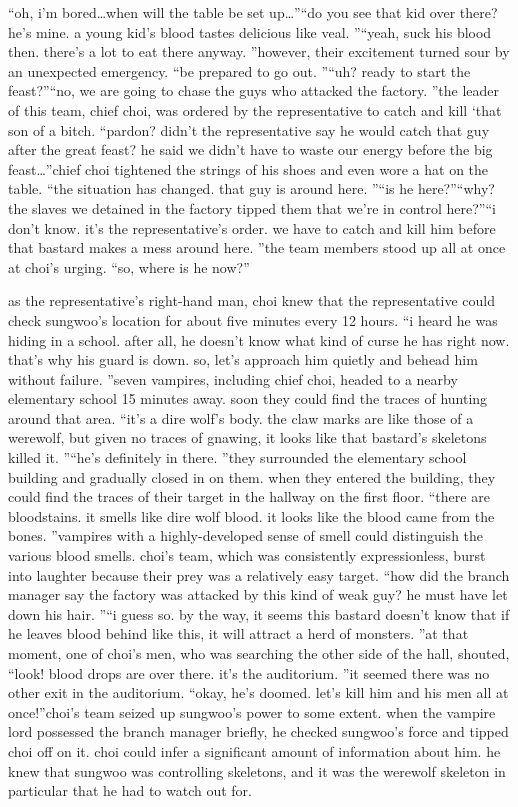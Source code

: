 “oh, i’m bored…when will the table be set up…”“do you see that kid over there? he’s mine.
 a young kid’s blood tastes delicious like veal.
”“yeah, suck his blood then.
 there’s a lot to eat there anyway.
”however, their excitement turned sour by an unexpected emergency.
“be prepared to go out.
”“uh? ready to start the feast?”“no, we are going to chase the guys who attacked the factory.
”the leader of this team, chief choi, was ordered by the representative to catch and kill ‘that son of a bitch.
“pardon? didn’t the representative say he would catch that guy after the great feast? he said we didn’t have to waste our energy before the big feast…”chief choi tightened the strings of his shoes and even wore a hat on the table.
“the situation has changed.
 that guy is around here.
”“is he here?”“why? the slaves we detained in the factory tipped them that we’re in control here?”“i don’t know.
 it’s the representative’s order.
 we have to catch and kill him before that bastard makes a mess around here.
”the team members stood up all at once at choi’s urging.
“so, where is he now?”

as the representative’s right-hand man, choi knew that the representative could check sungwoo’s location for about five minutes every 12 hours.
“i heard he was hiding in a school.
 after all, he doesn’t know what kind of curse he has right now.
 that’s why his guard is down.
 so, let’s approach him quietly and behead him without failure.
”seven vampires, including chief choi, headed to a nearby elementary school 15 minutes away.
 soon they could find the traces of hunting around that area.
“it’s a dire wolf’s body.
 the claw marks are like those of a werewolf, but given no traces of gnawing, it looks like that bastard’s skeletons killed it.
”“he’s definitely in there.
”they surrounded the elementary school building and gradually closed in on them.
when they entered the building, they could find the traces of their target in the hallway on the first floor.
“there are bloodstains.
 it smells like dire wolf blood.
 it looks like the blood came from the bones.
”vampires with a highly-developed sense of smell could distinguish the various blood smells.
 choi’s team, which was consistently expressionless, burst into laughter because their prey was a relatively easy target.
“how did the branch manager say the factory was attacked by this kind of weak guy? he must have let down his hair.
”“i guess so.
 by the way, it seems this bastard doesn’t know that if he leaves blood behind like this, it will attract a herd of monsters.
”at that moment, one of choi’s men, who was searching the other side of the hall, shouted, “look! blood drops are over there.
 it’s the auditorium.
”it seemed there was no other exit in the auditorium.
“okay, he’s doomed.
 let’s kill him and his men all at once!”choi’s team seized up sungwoo’s power to some extent.
 when the vampire lord possessed the branch manager briefly, he checked sungwoo’s force and tipped choi off on it.
choi could infer a significant amount of information about him.
 he knew that sungwoo was controlling skeletons, and it was the werewolf skeleton in particular that he had to watch out for.


 